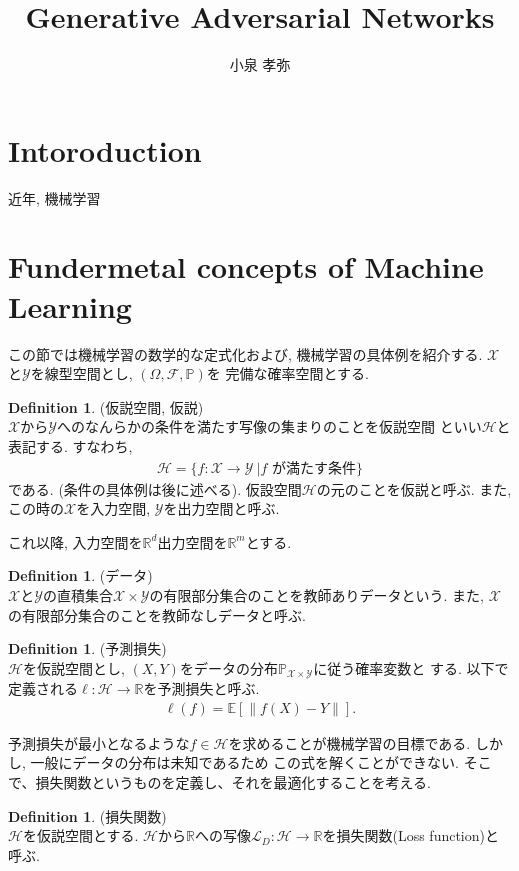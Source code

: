 \documentclass[11pt, a4paper, dvipdfmx]{jsarticle}
\title{Generative Adversarial Networks}
\author{小泉 孝弥}
\date{}
\theoremstyle{definition}
\newtheorem{Definition+}[Axiom+]{Definition}
\newcommand{\R}{\mathbb{R}}
\newcommand{\F}{\mathcal{F}}
\newcommand{\X}{\mathcal{X}}
\newcommand{\Y}{\mathcal{Y}}
\newcommand{\Hil}{\mathcal{H}}
\newcommand{\Loss}{\mathcal{L}_{D}}
\renewcommand{\P}{\mathbb{P}}
\newcommand{\Probsp}{(\Omega, \F, \P)}
\begin{document}
\maketitle
\section{Intoroduction}
近年, 機械学習
\section{Fundermetal concepts of Machine Learning}
この節では機械学習の数学的な定式化および, 機械学習の具体例を紹介する. $\X$と$\Y$を線型空間とし, $\Probsp$を
完備な確率空間とする.
\begin{Definition+}(仮説空間, 仮説)\\
    $\X$から$\Y$へのなんらかの条件を満たす写像の集まりのことを仮説空間
    といい$\Hil$と表記する. すなわち,
    \begin{align*}
        \Hil = \{f:\X\to\Y~| f\text{ が満たす条件}\}
    \end{align*}
    である. (条件の具体例は後に述べる). 仮設空間$\Hil$の元のことを仮説と呼ぶ.
    また, この時の$\X$を入力空間, $\Y$を出力空間と呼ぶ. 
\end{Definition+}
これ以降, 入力空間を$\R^{d}$出力空間を$\R^{m}$とする.
\begin{Definition+}(データ)\\
    $\X$と$\Y$の直積集合$\X\times\Y$の有限部分集合のことを教師ありデータという.
    また, $\X$の有限部分集合のことを教師なしデータと呼ぶ. 
\end{Definition+}
\begin{Definition+}(予測損失)\\
    $\Hil$を仮説空間とし, $(X, Y)$をデータの分布$\mathbb{P}_{\X\times\Y}$に従う確率変数と
    する. 以下で定義される$\ell:\Hil\to\R$を予測損失と呼ぶ.
    \begin{align*}
        \ell(f) = \mathbb{E}[\|f(X) - Y\|].
    \end{align*}
\end{Definition+}
予測損失が最小となるような$f\in\Hil$を求めることが機械学習の目標である. しかし, 一般にデータの分布は未知であるため
この式を解くことができない. そこで、損失関数というものを定義し、それを最適化することを考える.
\begin{Definition+}(損失関数)\\
    $\Hil$を仮説空間とする. $\Hil$から$\R$への写像$\Loss:\Hil\to\R$を損失関数(Loss function)と呼ぶ.
\end{Definition+}
\end{document}
